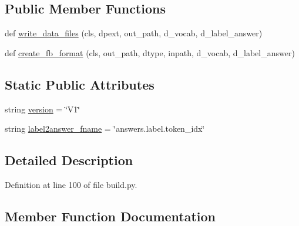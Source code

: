 \subsection*{Public Member Functions}
\begin{DoxyCompactItemize}
\item 
def \hyperlink{classparlai_1_1tasks_1_1insuranceqa_1_1build_1_1ParseInsuranceQAV1_aec860cdc7404febddbbc3434828c74e3}{write\+\_\+data\+\_\+files} (cls, dpext, out\+\_\+path, d\+\_\+vocab, d\+\_\+label\+\_\+answer)
\item 
def \hyperlink{classparlai_1_1tasks_1_1insuranceqa_1_1build_1_1ParseInsuranceQAV1_a67191000b24f2d3f3be641c5221b9a30}{create\+\_\+fb\+\_\+format} (cls, out\+\_\+path, dtype, inpath, d\+\_\+vocab, d\+\_\+label\+\_\+answer)
\end{DoxyCompactItemize}
\subsection*{Static Public Attributes}
\begin{DoxyCompactItemize}
\item 
string \hyperlink{classparlai_1_1tasks_1_1insuranceqa_1_1build_1_1ParseInsuranceQAV1_a2c80c19256c2c59a2c29ffc88e125165}{version} = \char`\"{}V1\char`\"{}
\item 
string \hyperlink{classparlai_1_1tasks_1_1insuranceqa_1_1build_1_1ParseInsuranceQAV1_a6d912e89848985844b85a5c6f2943f5e}{label2answer\+\_\+fname} = \char`\"{}answers.\+label.\+token\+\_\+idx\char`\"{}
\end{DoxyCompactItemize}


\subsection{Detailed Description}


Definition at line 100 of file build.\+py.



\subsection{Member Function Documentation}
\mbox{\label{classparlai_1_1tasks_1_1insuranceqa_1_1build_1_1ParseInsuranceQAV1_a67191000b24f2d3f3be641c5221b9a30}} 
